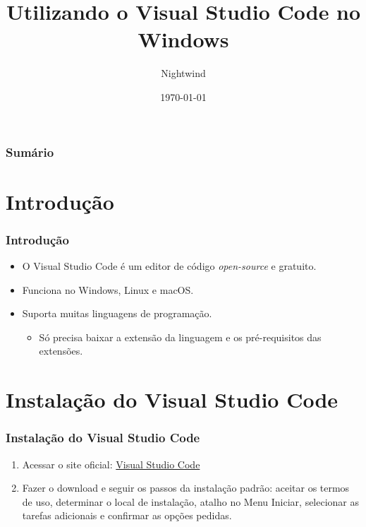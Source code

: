 \documentclass{beamer}
\title{Utilizando o Visual Studio Code no Windows}
\author{Nightwind}
\institute[CTISM]{Colégio Técnico Industrial de Santa Maria}
\date{\today}
\begin{document}
\frame{\titlepage}

\begin{frame}
    \frametitle{Sumário}
    \tableofcontents
\end{frame}

\section{Introdução}
\begin{frame}
    \frametitle{Introdução}

    \begin{itemize}
        \item O Visual Studio Code é um editor de código \textit{open-source} e gratuito.
        \item Funciona no Windows, Linux e macOS.
        \item Suporta muitas linguagens de programação.
        \begin{itemize}
            \item Só precisa baixar a extensão da linguagem e os pré-requisitos das extensões.
        \end{itemize}
    \end{itemize}

\end{frame}

\section{Instalação do Visual Studio Code}

\begin{frame}
    \frametitle{Instalação do Visual Studio Code}
    \begin{enumerate}
        \item Acessar o site oficial: \href{https://code.visualstudio.com/Download}{Visual Studio Code}
        \item Fazer o download e seguir os passos da instalação padrão: aceitar os termos de uso, determinar o local de instalação, atalho no Menu Iniciar, selecionar as tarefas adicionais e confirmar as opções pedidas.
    \end{enumerate}
\end{frame}
\end{document}
